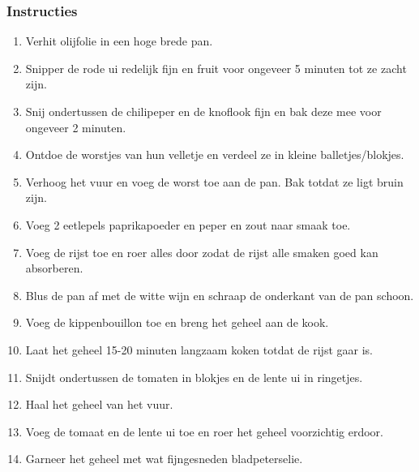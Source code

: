 \subsubsection*{Instructies}
\begin{multicols}{2}
    \begin{enumerate}
        \item Verhit olijfolie in een hoge brede pan.
        \item Snipper de rode ui redelijk fijn en fruit voor ongeveer 5 minuten tot ze zacht zijn.
        \item Snij ondertussen de chilipeper en de knoflook fijn en bak deze mee voor ongeveer 2 minuten.
        \item Ontdoe de worstjes van hun velletje en verdeel ze in kleine balletjes/blokjes.
        \item Verhoog het vuur en voeg de worst toe aan de pan. Bak totdat ze ligt bruin zijn.
        \item Voeg 2 eetlepels paprikapoeder en peper en zout naar smaak toe.
        \item Voeg de rijst toe en roer alles door zodat de rijst alle smaken goed kan absorberen.
        \item Blus de pan af met de witte wijn en schraap de onderkant van de pan schoon.
        \item Voeg de kippenbouillon toe en breng het geheel aan de kook.
        \item Laat het geheel 15-20 minuten langzaam koken totdat de rijst gaar is.
        \item Snijdt ondertussen de tomaten in blokjes en de lente ui in ringetjes.
        \item Haal het geheel van het vuur.
        \item Voeg de tomaat en de lente ui toe en roer het geheel voorzichtig erdoor.
        \item Garneer het geheel met wat \break fijngesneden bladpeterselie.
    \end{enumerate}
\end{multicols}